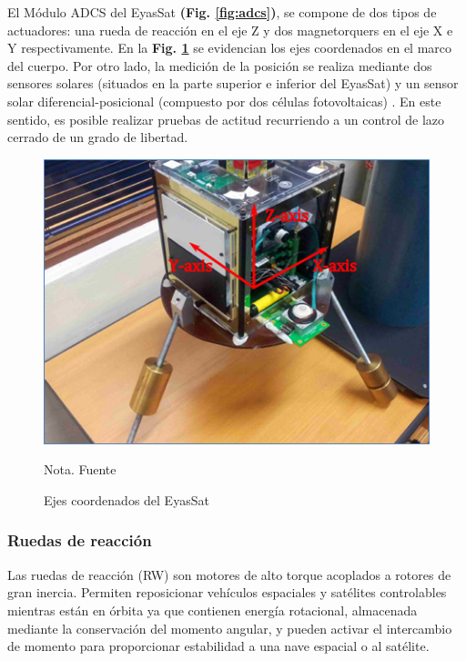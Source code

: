 El Módulo ADCS del EyasSat \textbf{(Fig. \ref{fig:adcs})}, se compone de dos tipos de actuadores: una rueda de reacción en el eje Z y dos magnetorquers en el eje X e Y respectivamente. En la \textbf{Fig. \ref{fig:eyassat_axes}} se evidencian los ejes coordenados en el marco del cuerpo.
Por otro lado, la medición de la posición se realiza mediante dos sensores solares (situados en la parte superior e inferior del EyasSat) y un sensor solar diferencial-posicional (compuesto por dos células fotovoltaicas) \cite{Ritchey2004}. En este sentido, es posible realizar pruebas de actitud recurriendo a un control de lazo cerrado de un grado de libertad. 

\begin{figure}[!ht]
	\begin{center}
		\includegraphics[scale=0.9]{imagenes/marco_teorico/eyassat_axes.PNG}\\
	\end{center}
	\caption{ Ejes coordenados del EyasSat}
	\label{fig:eyassat_axes}
	\footnotesize{Nota. Fuente \cite{Groenewald2014}}
\end{figure}


\subsubsection{Ruedas de reacción}

Las ruedas de reacción (RW) son motores de alto torque acoplados a rotores de gran inercia. Permiten reposicionar vehículos espaciales y satélites controlables mientras están en órbita ya que contienen energía rotacional, almacenada mediante la conservación del momento angular, y pueden activar el intercambio de momento para proporcionar estabilidad a una nave espacial o al satélite.


